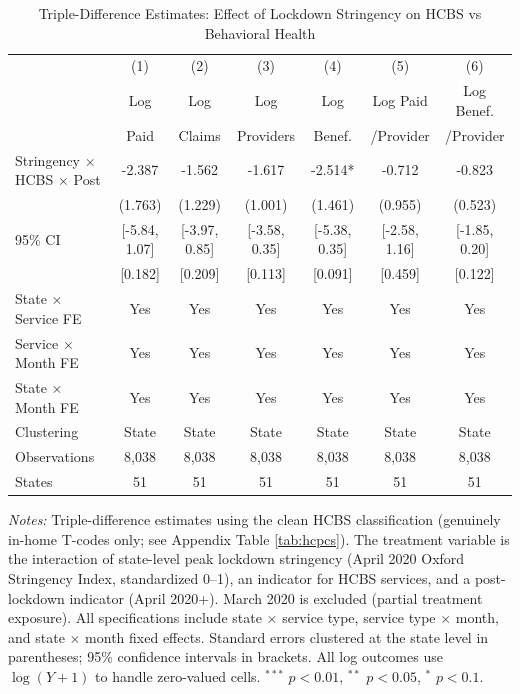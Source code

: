\begin{table}[htbp]
\centering
\caption{Triple-Difference Estimates: Effect of Lockdown Stringency on HCBS vs Behavioral Health}
\label{tab:main_ddd}
\small
\begin{tabular}{lcccccc}
\hline\hline
 & (1) & (2) & (3) & (4) & (5) & (6) \\
 & Log & Log & Log & Log & Log Paid & Log Benef. \\
 & Paid & Claims & Providers & Benef. & /Provider & /Provider \\
\hline
Stringency $\times$ HCBS $\times$ Post & -2.387 & -1.562 & -1.617 & -2.514* & -0.712 & -0.823 \\
 & (1.763) & (1.229) & (1.001) & (1.461) & (0.955) & (0.523) \\
95\% CI & [-5.84, 1.07] & [-3.97, 0.85] & [-3.58, 0.35] & [-5.38, 0.35] & [-2.58, 1.16] & [-1.85, 0.20] \\
 & [0.182] & [0.209] & [0.113] & [0.091] & [0.459] & [0.122] \\
[6pt]
\hline
State $\times$ Service FE & Yes & Yes & Yes & Yes & Yes & Yes \\
Service $\times$ Month FE & Yes & Yes & Yes & Yes & Yes & Yes \\
State $\times$ Month FE & Yes & Yes & Yes & Yes & Yes & Yes \\
Clustering & State & State & State & State & State & State \\
Observations & 8,038 & 8,038 & 8,038 & 8,038 & 8,038 & 8,038 \\
States & 51 & 51 & 51 & 51 & 51 & 51 \\
\hline\hline
\end{tabular}
\begin{minipage}{0.95\textwidth}
\vspace{4pt}
\footnotesize
\textit{Notes:} Triple-difference estimates using the clean HCBS classification (genuinely in-home T-codes only; see Appendix Table \ref{tab:hcpcs}). The treatment variable is the interaction of state-level peak lockdown stringency (April 2020 Oxford Stringency Index, standardized 0--1), an indicator for HCBS services, and a post-lockdown indicator (April 2020+). March 2020 is excluded (partial treatment exposure). All specifications include state $\times$ service type, service type $\times$ month, and state $\times$ month fixed effects. Standard errors clustered at the state level in parentheses; 95\% confidence intervals in brackets. All log outcomes use $\log(Y + 1)$ to handle zero-valued cells. $^{***}$ $p<0.01$, $^{**}$ $p<0.05$, $^{*}$ $p<0.1$.
\end{minipage}
\end{table}
